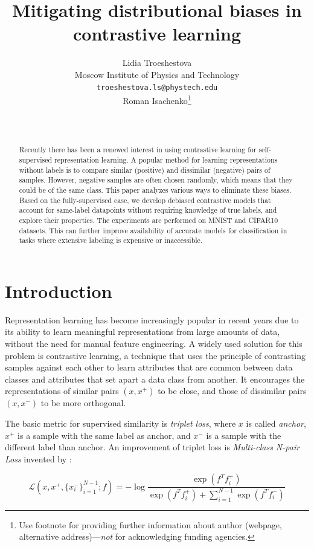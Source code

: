 \documentclass{article}
\title{Mitigating distributional biases in contrastive learning}
\author{ Lidia Troeshestova \\
	Moscow Institute of Physics and Technology\\
	\texttt{troeshestova.ls@phystech.edu} \\
	\And
	Roman Isachenko\thanks{Use footnote for providing further information about author (webpage, alternative address)---\emph{not} for acknowledging funding agencies.} \\
	   \\
	\texttt{} \\
}
\date{}
\begin{document}
\maketitle

\begin{abstract}
	Recently there has been a renewed interest in using contrastive learning for self-supervised representation learning. A popular method for learning representations without labels is to compare similar (positive) and dissimilar (negative) pairs of samples. However, negative samples are often chosen randomly, which means that they could be of the same class. This paper analyzes various ways to eliminate these biases. Based on the fully-supervised case, we develop debiased contrastive models that account for same-label datapoints without requiring knowledge of true labels, and explore their properties. The experiments are performed on MNIST and CIFAR10 datasets. This can further improve availability of accurate models for classification in tasks where extensive labeling is expensive or inaccessible.
\end{abstract}



\section{Introduction}
Representation learning has become increasingly popular in recent years due to its ability to learn meaningful representations from large amounts of data, without the need for manual feature engineering. A widely used solution for this problem is contrastive learning, a technique that uses the principle of contrasting samples against each other to learn attributes that are common between data classes and attributes that set apart a data class from another. It encourages the representations of similar pairs $(x, x^+)$ to be close, and those of dissimilar pairs $(x, x^-)$ to be more orthogonal.

The basic metric for supervised similarity is \textit{triplet loss}, where $x$ is called \textit{anchor}, $x^+$ is a sample with the same label as anchor, and $x^-$ is a sample with the different label than anchor. An improvement of triplet loss is \textit{Multi-class N-pair Loss} invented by \citep{NIPS2016_6b180037}:

\begin{equation} \label{eq:1}
\mathcal{L}(x, x^+, \{x_i^-\}_{i=1}^{N-1}; f) = - \log \frac{\exp(f^T f_i^+)}{\exp(f^T f_i^+) + \sum _{i=1}^{N-1} \exp(f^Tf_i^-)}
\end{equation}
\end{document}
